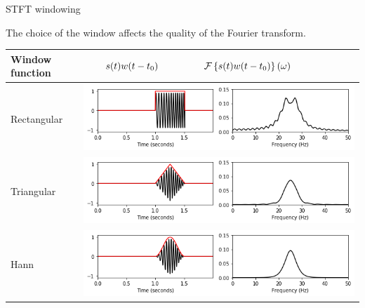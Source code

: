 \documentclass[10pt,american,ignorenonframetext,aspectratio=1610]{beamer}
\theoremstyle{remark}
\begin{document}
\begin{frame}{STFT windowing}
\protect\hypertarget{stft-windowing}{}

The choice of the window affects the quality of the Fourier transform.

\begin{tabular}{ >{\centering\arraybackslash} m{3cm} >{\centering\arraybackslash} m{9cm} }

Window function & $\hspace{.7cm}s(t)w(t-t_0) \hspace{1.7cm} \mathcal{F}\left\{s(t)w(t-t_0)\right\}(\omega)$\\\hline
Rectangular     & \includegraphics[width=.6\textwidth]{img/w_rectangle.png}\\
Triangular      & \includegraphics[width=.6\textwidth]{img/w_triangle.png}\\
Hann            & \includegraphics[width=.6\textwidth]{img/w_hann.png}
\end{tabular}

\end{frame}
\end{document}
